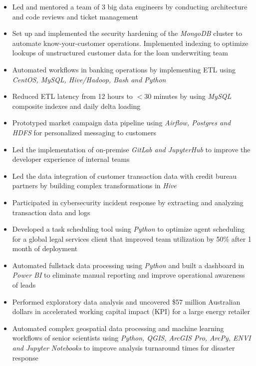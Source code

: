 \begin{itemize}
  \item Led and mentored a team of 3 big data engineers by conducting architecture and code reviews and ticket management
  \item Set up and implemented the security hardening of the \emph{MongoDB} cluster to automate know-your-customer operations. Implemented indexing to optimize lookups of unstructured customer data for the loan underwriting team
  \item Automated workflows in banking operations by implementing ETL using \emph{CentOS, MySQL, Hive/Hadoop, Bash and Python}
  \item Reduced ETL latency from 12 hours to $<$30 minutes by using \emph{MySQL} composite indexes and daily delta loading
  \item Prototyped market campaign data pipeline using \emph{Airflow, Postgres and HDFS} for personalized messaging to customers
  \item Led the implementation of on-premise \emph{GitLab and JupyterHub} to improve the developer experience of internal teams
  \item Led the data integration of customer transaction data with credit bureau partners by building complex transformations in \emph{Hive}
  \item Participated in cybersecurity incident response by extracting and analyzing transaction data and logs
\end{itemize}

\begin{itemize}
  \item Developed a task scheduling tool using \emph{Python} to optimize agent scheduling for a global legal services client that improved team utilization by 50\% after 1 month of deployment
  \item Automated fullstack data processing using \emph{Python} and built a dashboard in \emph{Power BI} to eliminate manual reporting and improve operational awareness of leads
  \item Performed exploratory data analysis and uncovered \$57 million Australian dollars in accelerated working capital impact (KPI) for a large energy retailer
\end{itemize}

\begin{itemize}
  \item Automated complex geospatial data processing and machine learning workflows of senior scientists using \emph{Python, QGIS, ArcGIS Pro, ArcPy, ENVI and Jupyter Notebooks} to improve analysis turnaround times for disaster response
\end{itemize}

